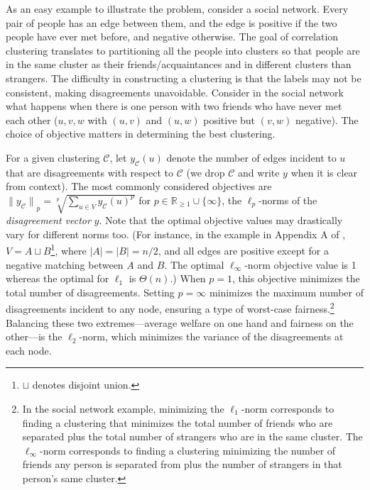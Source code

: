 \documentclass[11pt]{article}
\begin{document}
As an easy example to illustrate the problem,
consider a social network. Every pair of people has an edge between them, 
and the edge is positive if the two people have ever met before, and negative otherwise.
The goal of correlation clustering translates to partitioning all the people into clusters so that people are in the same cluster as their friends/acquaintances and in different clusters than strangers. 
The difficulty in constructing a clustering is that the labels may not be consistent, making disagreements unavoidable. Consider in the social network what happens when there is one person with two friends who have never met each other ($u,v,w$ with $(u,v)$ and $(u,w)$ positive but $(v,w)$ negative).
The choice of objective matters in determining the best clustering.


For a given clustering $\mathcal{C}$, let $y_{\mathcal{C}}(u)$ denote the number of edges incident to $u$ that are disagreements with respect to $\mathcal{C}$ (we drop $\mathcal{C}$ and write $y$ when it is clear from context).  
The most commonly considered objectives are ${\lVert y_{\mathcal{C}} \rVert}_p = \sqrt[p]{\sum_{u \in V} y_{\mathcal{C}}(u)^p}$ for $p \in \mathbb{R}_{\geq 1} \cup \{\infty\}$,
the $\ell_p$-norms of the \emph{disagreement vector} $y$.   
Note that the optimal objective values may drastically vary for different norms too.  (For instance, in the example in Appendix A of \cite{PM16}, $V=A \sqcup B$\footnote{$\sqcup$ denotes disjoint union.}, where $|A| = |B| = n/2$, and all edges are positive except for a negative matching between $A$ and $B$. The optimal $\ell_\infty$-norm objective value is 1 whereas the optimal for $\ell_1$ is $\Theta(n)$.)
When $p=1$, this objective minimizes the total number of disagreements.  Setting $p = \infty$ minimizes the maximum number of disagreements incident to any node, ensuring a type of worst-case fairness.\footnote{In the social network example, minimizing the $\ell_1$-norm corresponds to finding a clustering that minimizes the total number of friends who are separated plus the total number of strangers who are in the same cluster. The $\ell_\infty$-norm corresponds to finding a clustering minimizing the number of friends any person is separated from plus the number of strangers in that person's same cluster.}  
Balancing these two extremes---average welfare on one hand and fairness on the other---is the $\ell_2$-norm, which minimizes the variance of the disagreements at each node.
\end{document}
